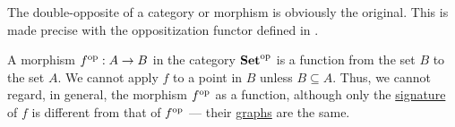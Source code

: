 \begin{remark}\label{rem:double_opposite_category}
  The double-opposite of a category or morphism is obviously the original. This is made precise with the oppositization functor defined in .
\end{remark}

\begin{example}\label{ex:def:opposite_category}
  A morphism \( f^{\operatorname{op}}: A \to B \) in the category \( \operatorname{\mathbf{Set}}^{\operatorname{op}} \) is a function from the set \( B \) to the set \( A \). We cannot apply \( f \) to a point in \( B \) unless \( B \subseteq A \). Thus, we cannot regard, in general, the morphism \( f^{\operatorname{op}} \) as a function, although only the \hyperref[def:function]{signature} of \( f \) is different from that of \( f^{\operatorname{op}} \) --- their \hyperref[def:set_valued_map/graph]{graphs} are the same.
\end{example}

